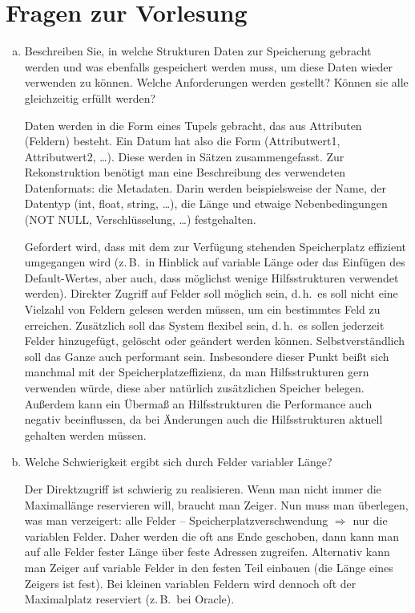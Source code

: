 \section{Fragen zur Vorlesung}

\begin{enumerate}[a)]

	\item Beschreiben Sie, in welche Strukturen Daten zur Speicherung gebracht werden und was ebenfalls gespeichert werden muss, um diese Daten wieder verwenden zu können. Welche Anforderungen werden gestellt? Können sie alle gleichzeitig erfüllt werden?

	\begin{solution}
	Daten werden in die Form eines Tupels gebracht, das aus Attributen (Feldern) besteht. Ein Datum hat also die Form (Attributwert1, Attributwert2, \ldots ). Diese werden in Sätzen zusammengefasst. Zur Rekonstruktion benötigt man eine Beschreibung des verwendeten Datenformats: die Metadaten. Darin werden beispielsweise der Name, der Datentyp (int, float, string, \ldots ), die Länge und etwaige Nebenbedingungen (NOT NULL, Verschlüsselung, \ldots ) festgehalten.

	Gefordert wird, dass mit dem zur Verfügung stehenden Speicherplatz effizient umgegangen wird (z.\,B.\ in Hinblick auf variable Länge oder das Einfügen des Default-Wertes, aber auch, dass möglichst wenige Hilfsstrukturen verwendet werden). Direkter Zugriff auf Felder soll möglich sein, d.\,h.\ es soll nicht eine Vielzahl von Feldern gelesen werden müssen, um ein bestimmtes Feld zu erreichen. Zusätzlich soll das System flexibel sein, d.\,h.\ es sollen jederzeit Felder hinzugefügt, gelöscht oder geändert werden können. Selbstverständlich soll das Ganze auch performant sein. Insbesondere dieser Punkt beißt sich manchmal mit der Speicherplatzeffizienz, da man Hilfsstrukturen gern verwenden würde, diese aber natürlich zusätzlichen Speicher belegen. Außerdem kann ein Übermaß an Hilfsstrukturen die Performance auch negativ beeinflussen, da bei Änderungen auch die Hilfsstrukturen aktuell gehalten werden müssen.
	\end{solution}

	\item Welche Schwierigkeit ergibt sich durch Felder variabler Länge?

	\begin{solution}
	Der Direktzugriff ist schwierig zu realisieren. Wenn man nicht immer die Maximallänge reservieren will, braucht man Zeiger. Nun muss man überlegen, was man verzeigert: alle Felder -- Speicherplatzverschwendung $\Rightarrow$ nur die variablen Felder. Daher werden die oft ans Ende geschoben, dann kann man auf alle Felder fester Länge über feste Adressen zugreifen. Alternativ kann man Zeiger auf variable Felder in den festen Teil einbauen (die Länge eines Zeigers ist fest). Bei kleinen variablen Feldern wird dennoch oft der Maximalplatz reserviert (z.\,B.\ bei Oracle).
	\end{solution}


\end{enumerate}
